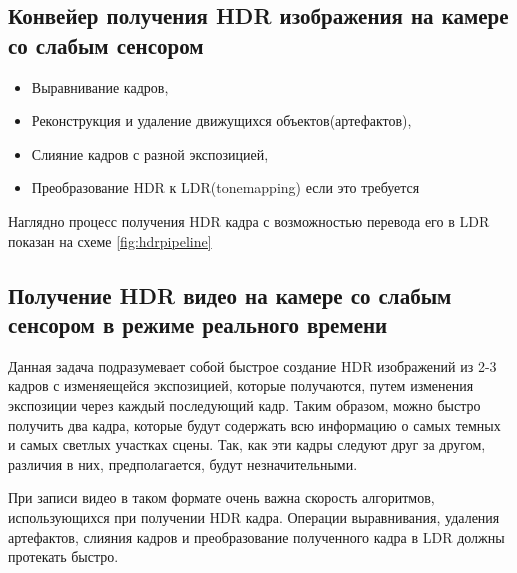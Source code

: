 \subsection { Конвейер получения HDR изображения на камере со слабым сенсором}
\begin{itemize}
    \item Выравнивание кадров,
    \item Реконструкция и удаление движущихся объектов(артефактов),
    \item Слияние кадров с разной экспозицией,
    \item Преобразование HDR к LDR(tonemapping) если это требуется
\end{itemize}

Наглядно процесс получения HDR кадра с возможностью перевода его в LDR показан на схеме \ref{fig:hdrpipeline}

\begin{figure}[ht!]
\end{figure}

\subsection{ Получение HDR видео на камере со слабым сенсором в режиме реального времени}
    
    Данная задача подразумевает собой быстрое создание HDR изображений из 2-3 кадров с изменяещейся экспозицией, которые получаются, путем изменения экспозиции через каждый последующий кадр. Таким образом, можно быстро получить два кадра, которые будут содержать всю информацию о самых темных и самых светлых участках сцены. Так, как эти кадры следуют друг за другом, различия в них, предполагается, будут незначительными.

    При записи видео в таком формате очень важна скорость алгоритмов, использующихся при получении HDR кадра. Операции выравнивания, удаления артефактов, слияния кадров и преобразование полученного кадра в LDR должны протекать быстро.

